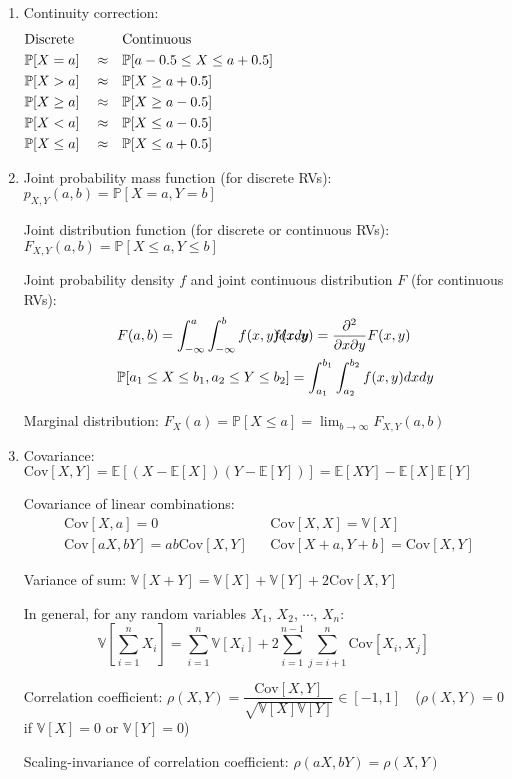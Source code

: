 \documentclass{article}
\begin{document}
\begin{enumerate}
	\item Continuity correction:
		\vspace*{-0.5\baselineskip}
		\begin{align*}
			&\text{Discrete} &&        &&\text{Continuous}\hspace*{8cm} \\
			&\mathbb{P}[X=a] &&\approx &&\mathbb{P}[a-0.5\leq X\leq a+0.5] \\
			&\mathbb{P}[X>a] &&\approx &&\mathbb{P}[X\geq a+0.5] \\
			&\mathbb{P}[X\geq a] &&\approx &&\mathbb{P}[X\geq a-0.5] \\
			&\mathbb{P}[X<a] &&\approx &&\mathbb{P}[X\leq a-0.5] \\
			&\mathbb{P}[X\leq a] &&\approx &&\mathbb{P}[X\leq a+0.5]
		\end{align*}	
		
	\item Joint probability mass function (for discrete RVs): $p_{X,Y}(a,b)=\mathbb{P}[X=a,Y=b]$
	
		Joint distribution function (for discrete or continuous RVs): $F_{X,Y}(a,b)=\mathbb{P}[X\leq a,Y\leq b]$
		
		Joint probability density $f$ and joint continuous distribution $F$ (for continuous RVs):
		\begin{align*}
			&F(a,b)=\int_{-\infty}^{a}\int_{-\infty}^{b}f(x,y)dxdy &&\hspace*{-4.4cm}f(x,y)=\frac{\partial^2}{\partial x\partial y}F(x,y) \\
			&\mathbb{P}[a_1\leq X\leq b_1, a_2\leq Y\leq b_2]=\int_{a_1}^{b_1}\int_{a_2}^{b_2}f(x,y)dxdy
		\end{align*}
		
		Marginal distribution: $F_X(a)=\mathbb{P}[X\leq a]=\displaystyle\lim_{b\to\infty}F_{X,Y}(a,b)$
	
	\item Covariance: $\mathrm{Cov}[X,Y]=\mathbb{E}\left[(X-\mathbb{E}[X])(Y-\mathbb{E}[Y])\right]=\mathbb{E}[XY]-\mathbb{E}[X]\mathbb{E}[Y]$
		
		Covariance of linear combinations:
		\begin{align*}
			&\mathrm{Cov}[X,a]=0 &&\mathrm{Cov}[X,X]=\mathbb{V}[X] \\
			&\mathrm{Cov}[aX,bY]=ab\mathrm{Cov}[X,Y] &&\mathrm{Cov}[X+a,Y+b]=\mathrm{Cov}[X,Y]
		\end{align*}
		
		Variance of sum: $\mathbb{V}[X+Y]=\mathbb{V}[X]+\mathbb{V}[Y]+2\mathrm{Cov}[X,Y]$
		
		In general, for any random variables $X_1$, $X_2$, $\cdots$, $X_n$:
		$$\mathbb{V}\left[\sum_{i=1}^{n}X_i\right]=\sum_{i=1}^{n}\mathbb{V}[X_i]+2\sum_{i=1}^{n-1}\sum_{j=i+1}
		^{n}\mathrm{Cov}[X_i,X_j]$$
		
		Correlation coefficient: $\rho(X,Y)=\dfrac{\mathrm{Cov}[X,Y]}{\sqrt{\mathbb{V}[X]\mathbb{V}[Y]}}\in[-1,1]$\ \ ($\rho(X,Y)=0$ if $\mathbb{V}[X]=0$ or $\mathbb{V}[Y]=0$)
		
		Scaling-invariance of correlation coefficient: $\rho(aX,bY)=\rho(X,Y)$
	
\end{enumerate}
\end{document}
